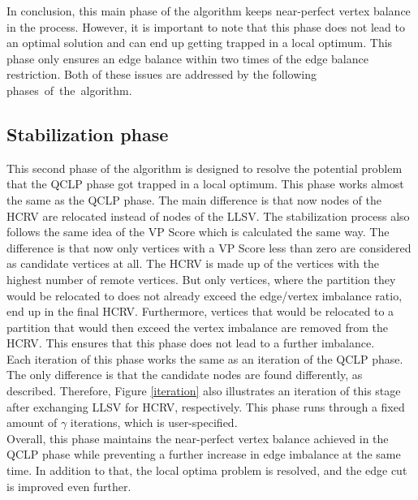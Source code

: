 \documentclass[acmsmall,nonacm,screen,review]{acmart}
\begin{document}
In conclusion, this main phase of the algorithm keeps near-perfect vertex balance in the process. However, it is important to note that this phase does not lead to an optimal solution and can end up getting trapped in a local optimum. This phase only ensures an edge balance within two times of the edge balance restriction. Both of these issues are addressed by the following \hbox{phases of the algorithm.}
\subsection{Stabilization phase}
This second phase of the algorithm is designed to resolve the potential problem that the QCLP phase got trapped in a local optimum. This phase works almost the same as the QCLP phase. The main difference is that now nodes of the HCRV are relocated instead of nodes of the LLSV. The stabilization process also follows the same idea of the VP Score which is calculated the same way. The difference is that now only vertices with a VP Score less than zero are considered as candidate vertices at all. The HCRV is made up of the vertices with the highest number of remote vertices. But only vertices, where the partition they would be relocated to does not already exceed the edge/vertex imbalance ratio, end up in the final HCRV. Furthermore, vertices that would be relocated to a partition that would then exceed the vertex imbalance are removed from the HCRV. This ensures that this phase does not lead to a further imbalance. \\
Each iteration of this phase works the same as an iteration of the QCLP phase. The only difference is that the candidate nodes are found differently, as described. Therefore, Figure \ref{iteration} also illustrates an iteration of this stage after exchanging LLSV for HCRV, respectively. This phase runs through a fixed amount of $\gamma$ iterations, which is user-specified. \\
Overall, this phase maintains the near-perfect vertex balance achieved in the QCLP phase while preventing a further increase in edge imbalance at the same time. In addition to that, the local optima problem is resolved, and the edge cut is improved even further.
\end{document}
